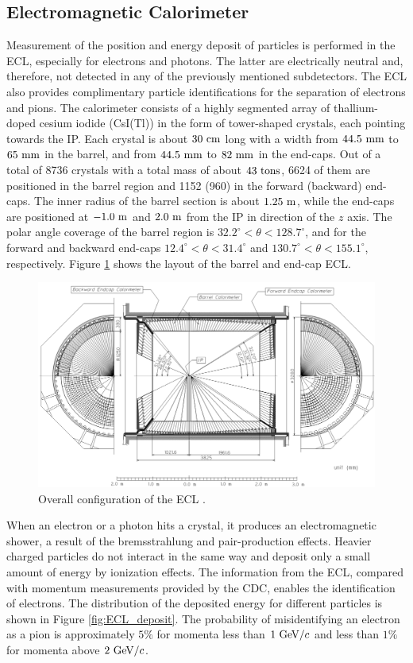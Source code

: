 \subsection{Electromagnetic Calorimeter}
Measurement of the position and energy deposit of particles is performed in the ECL, especially for electrons and photons. The latter are electrically neutral and, therefore, not detected in any of the previously mentioned subdetectors. The ECL also provides complimentary particle identifications for the separation of electrons and pions. The calorimeter consists of a highly segmented array of thallium-doped cesium iodide (CsI(Tl)) in the form of tower-shaped crystals, each pointing towards the IP. Each crystal is about $30\mathrm{~cm}$ long with a width from $44.5\mathrm{~mm}$ to $65\mathrm{~mm}$ in the barrel, and from $44.5\mathrm{~mm}$ to $82\mathrm{~mm}$ in the end-caps. Out of a total of 8736 crystals with a total mass of about $43\mathrm{~tons}$, 6624 of them are positioned in the barrel region and 1152 (960) in the forward (backward) end-caps. The inner radius of the barrel section is about $1.25\mathrm{~m}$, while the end-caps are positioned at $-1.0\mathrm{~m}$ and $2.0\mathrm{~m}$ from the IP in direction of the $z$ axis. The polar angle coverage of the barrel region is $32.2^\circ < \theta < 128.7^\circ$, and for the forward and backward end-caps $12.4^\circ < \theta < 31.4^\circ$ and $130.7^\circ < \theta < 155.1^\circ$, respectively. Figure \ref{fig:ECL_layout} shows the layout of the barrel and end-cap ECL. 
\begin{figure}[H]
	\centering
	\captionsetup{width=0.8\linewidth}
	\includegraphics[width=\linewidth]{fig/setup/ECL_layout}
	\caption{Overall configuration of the ECL \cite{ABASHIAN2002117}.}
	\label{fig:ECL_layout}
\end{figure}
When an electron or a photon hits a crystal, it produces an electromagnetic shower, a result of the bremsstrahlung and pair-production effects. Heavier charged particles do not interact in the same way and deposit only a small amount of energy by ionization effects. The information from the ECL, compared with momentum measurements provided by the CDC, enables the identification of electrons. The distribution of the deposited energy for different particles is shown in Figure \ref{fig:ECL_deposit}. The probability of misidentifying an electron as a pion is approximately $5\%$ for momenta less than $1\mathrm{~GeV}/c$ and less than $1\%$ for momenta above $2\mathrm{~GeV}/c$.

